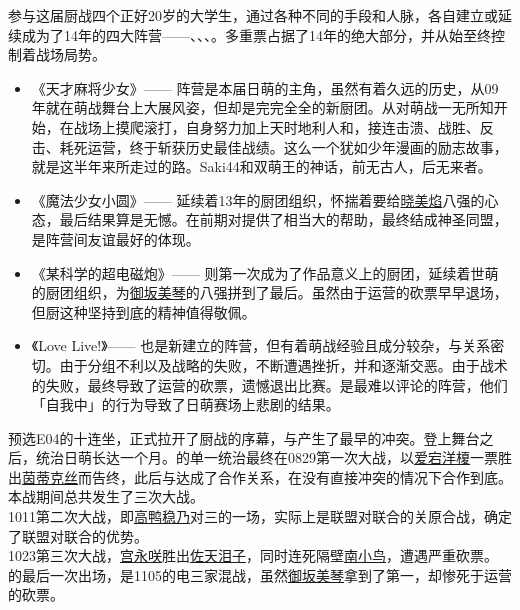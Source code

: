 参与这届厨战四个正好20岁的大学生，通过各种不同的手段和人脉，各自建立或延续成为了14年的四大阵营——、、、。多重票占据了14年的绝大部分，并从始至终控制着战场局势。

\begin{itemize}
\item 《{天才麻将少女}》——
阵营是本届日萌的主角，虽然有着久远的历史，从09年就在萌战舞台上大展风姿，但却是完完全全的新厨团。从对萌战一无所知开始，在战场上摸爬滚打，自身努力加上天时地利人和，接连击溃、战胜、反击、耗死运营，终于斩获历史最佳战绩。这么一个犹如少年漫画的励志故事，就是这半年来所走过的路。Saki44和双萌王的神话，前无古人，后无来者。
\item 《{魔法少女小圆}》——
延续着13年的厨团组织，怀揣着要给\uline{晓美焰}八强的心态，最后结果算是无憾。在前期对提供了相当大的帮助，最终结成神圣同盟，是阵营间友谊最好的体现。
\item 《{某科学的超电磁炮}》——
则第一次成为了作品意义上的厨团，延续着世萌的厨团组织，为\uline{御坂美琴}的八强拼到了最后。虽然由于运营的砍票早早退场，但厨这种坚持到底的精神值得敬佩。
\item 《{Love Live!}》——
也是新建立的阵营，但有着萌战经验且成分较杂，与关系密切。由于分组不利以及战略的失败，不断遭遇挫折，并和逐渐交恶。由于战术的失败，最终导致了运营的砍票，遗憾退出比赛。是最难以评论的阵营，他们「自我中」的行为导致了日萌赛场上悲剧的结果。
\end{itemize}

\newpage

预选E04的十连坐，正式拉开了厨战的序幕，与产生了最早的冲突。登上舞台之后，统治日萌长达一个月。的单一统治最终在0829第一次大战，以\uline{爱宕洋榎}一票胜出\uline{茵蒂克丝}而告终，此后与达成了合作关系，在没有直接冲突的情况下合作到底。本战期间总共发生了三次大战。\\
1011第二次大战，即\uline{高鸭稳乃}对三的一场，实际上是联盟对联合的关原合战，确定了联盟对联合的优势。\\
1023第三次大战，\uline{宫永咲}胜出\uline{佐天泪子}，同时连死隔壁\uline{南小鸟}，遭遇严重砍票。\\
的最后一次出场，是1105的电三家混战，虽然\uline{御坂美琴}拿到了第一，却惨死于运营的砍票。

